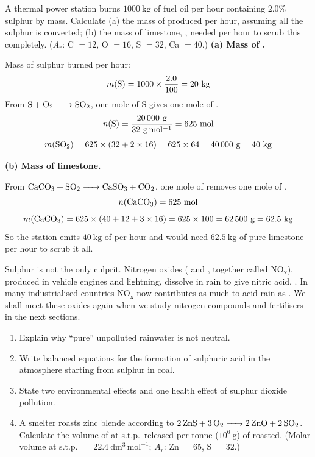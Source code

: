 \documentclass[11pt]{article}
\begin{document}
\begin{exoresolu}
A thermal power station burns $1000\ \mathrm{kg}$ of fuel oil per hour containing $2.0\%$ sulphur by mass. Calculate (a) the mass of  produced per hour, assuming all the sulphur is converted; (b) the mass of limestone, , needed per hour to scrub this  completely. ($A_r$: C $=12$, O $=16$, S $=32$, Ca $=40$.)
\tcblower
\textbf{(a) Mass of .}

Mass of sulphur burned per hour:
\[ m(\ce{S}) = 1000 \times \frac{2.0}{100} = 20\ \mathrm{kg} \]
From $\ce{S + O2 -> SO2}$, one mole of S gives one mole of .
\[ n(\ce{S}) = \frac{20\,000\ \mathrm{g}}{32\ \mathrm{g\,mol^{-1}}} = 625\ \mathrm{mol} \]
\[ m(\ce{SO2}) = 625 \times (32 + 2\times16) = 625 \times 64 = 40\,000\ \mathrm{g} = 40\ \mathrm{kg} \]

\textbf{(b) Mass of limestone.}

From $\ce{CaCO3 + SO2 -> CaSO3 + CO2}$, one mole of  removes one mole of .
\[ n(\ce{CaCO3}) = 625\ \mathrm{mol} \]
\[ m(\ce{CaCO3}) = 625 \times (40 + 12 + 3\times16) = 625 \times 100 = 62\,500\ \mathrm{g} = 62.5\ \mathrm{kg} \]
So the station emits $40\ \mathrm{kg}$ of  per hour and would need $62.5\ \mathrm{kg}$ of pure limestone per hour to scrub it all.
\end{exoresolu}

\begin{savaistu}
Sulphur is not the only culprit. Nitrogen oxides ( and , together called \ensuremath{\mathrm{NO_{x}}}), produced in vehicle engines and lightning, dissolve in rain to give nitric acid, . In many industrialised countries \ensuremath{\mathrm{NO_{x}}} now contributes as much to acid rain as . We shall meet these oxides again when we study nitrogen compounds and fertilisers in the next sections.
\end{savaistu}

\begin{exercice}
\begin{enumerate}
\item Explain why ``pure'' unpolluted rainwater is not neutral.
\item Write balanced equations for the formation of sulphuric acid in the atmosphere starting from sulphur in coal.
\item State two environmental effects and one health effect of sulphur dioxide pollution.
\item A smelter roasts zinc blende according to $\ce{2ZnS + 3O2 -> 2ZnO + 2SO2}$. Calculate the volume of  at s.t.p.\ released per tonne ($10^6\ \mathrm{g}$) of  roasted. (Molar volume at s.t.p.\ $= 22.4\ \mathrm{dm^3\,mol^{-1}}$; $A_r$: Zn $=65$, S $=32$.)
\end{enumerate}
\end{exercice}
\end{document}
